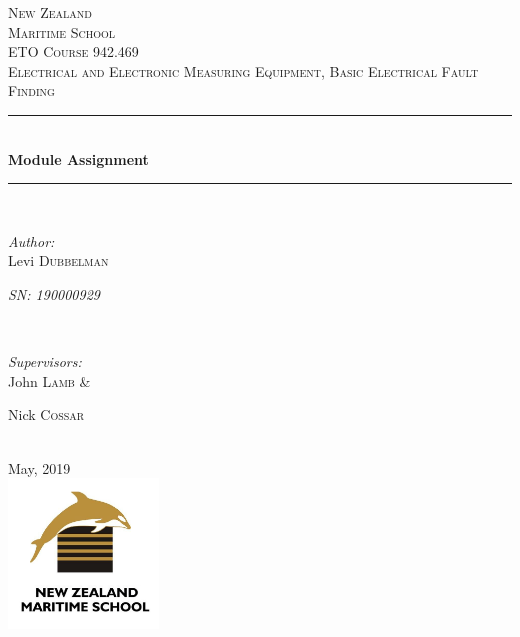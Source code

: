 \documentclass[11pt,a4paper]{article}
\begin{document}
\begin{titlepage}

\newcommand{\HRule}{\rule{\linewidth}{0.5mm}} %

\center %


\textsc{\LARGE New Zealand}\\[0.5cm]

\textsc{\LARGE  Maritime School}\\[1.5cm]
\textsc{\Large ETO Course 942.469}\\[0.2cm] %
\textsc{\large Electrical and Electronic Measuring Equipment, Basic Electrical Fault Finding}\\[0.5cm] %


\HRule \\[0.5cm]
{ \huge \bfseries Module Assignment}\\[0.2cm] %
\HRule \\[0.5cm]
\begin{minipage}{0.4\textwidth}
\begin{flushleft} \large
\emph{Author:}\\
Levi \textsc{Dubbelman}

\textit{SN: 190000929}\par
\end{flushleft}
\end{minipage}
~
\begin{minipage}{0.4\textwidth}
\begin{flushright} \large
\emph{Supervisors:} \\
John \textsc{Lamb} \&

Nick \textsc{Cossar}
\end{flushright}
\end{minipage}\\[2cm]
{\large May, 2019}\\[2cm]
\includegraphics[width=4cm]{logo.png}
\vfill
\end{titlepage}
\tableofcontents
\newpage
\end{document}

